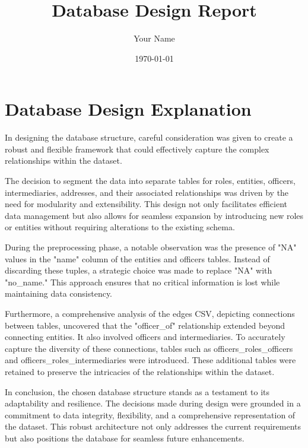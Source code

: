 \documentclass{article}
\title{Database Design Report}
\author{Your Name}
\date{\today}
\begin{document}
\maketitle

\section*{\centering Database Design Explanation}

In designing the database structure, careful consideration was given to create a robust and flexible framework that could effectively capture the complex relationships within the dataset.

The decision to segment the data into separate tables for roles, entities, officers, intermediaries, addresses, and their associated relationships was driven by the need for modularity and extensibility. This design not only facilitates efficient data management but also allows for seamless expansion by introducing new roles or entities without requiring alterations to the existing schema.

During the preprocessing phase, a notable observation was the presence of "NA" values in the "name" column of the entities and officers tables. Instead of discarding these tuples, a strategic choice was made to replace "NA" with "no\_name." This approach ensures that no critical information is lost while maintaining data consistency.

Furthermore, a comprehensive analysis of the edges CSV, depicting connections between tables, uncovered that the "officer\_of" relationship extended beyond connecting entities. It also involved officers and intermediaries. To accurately capture the diversity of these connections, tables such as officers\_roles\_officers and officers\_roles\_intermediaries were introduced. These additional tables were retained to preserve the intricacies of the relationships within the dataset.

In conclusion, the chosen database structure stands as a testament to its adaptability and resilience. The decisions made during design were grounded in a commitment to data integrity, flexibility, and a comprehensive representation of the dataset. This robust architecture not only addresses the current requirements but also positions the database for seamless future enhancements.
\end{document}
